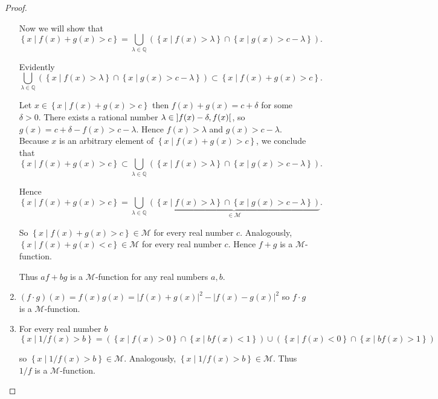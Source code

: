 \begin{proof}
\begin{enumerate}[label={(\arabic*)}]
		      Now we will show that
		      \[
			      \left\{ x \mid f(x) + g(x) > c \right\} = \bigcup_{\lambda \in \mathbb{Q}} \left( \left\{ x \mid f(x) > \lambda \right\} \cap \left\{ x \mid g(x) > c - \lambda \right\} \right).
		      \]

		      Evidently
		      \[
			      \bigcup_{\lambda \in \mathbb{Q}} \left( \left\{ x \mid f(x) > \lambda \right\} \cap \left\{ x \mid g(x) > c - \lambda \right\} \right) \subset \left\{ x \mid f(x) + g(x) > c \right\}.
		      \]

		      Let \( x \in \left\{ x \mid f(x) + g(x) > c \right\} \) then \( f(x) + g(x) = c + \delta \) for some \( \delta > 0 \). There exists a rational number \( \lambda \in \left\rbrack{f(x) - \delta, f(x)}\right\lbrack \), so \( g(x) = c + \delta - f(x) > c - \lambda \). Hence \( f(x) > \lambda \) and \( g(x) > c - \lambda \). Because \( x \) is an arbitrary element of \(  \left\{ x \mid f(x) + g(x) > c \right\} \), we conclude that
		      \[
			      \left\{ x \mid f(x) + g(x) > c \right\} \subset \bigcup_{\lambda \in \mathbb{Q}} \left( \left\{ x \mid f(x) > \lambda \right\} \cap \left\{ x \mid g(x) > c - \lambda \right\} \right).
		      \]

		      Hence
		      \[
			      \left\{ x \mid f(x) + g(x) > c \right\} = \bigcup_{\lambda \in \mathbb{Q}} \underbrace{\left( \left\{ x \mid f(x) > \lambda \right\} \cap \left\{ x \mid g(x) > c - \lambda \right\} \right)}_{\in \mathscr{M}}.
		      \]

		      So \( \left\{ x \mid f(x) + g(x) > c \right\} \in \mathscr{M} \) for every real number \( c \). Analogously, \( \left\{ x \mid f(x) + g(x) < c \right\} \in \mathscr{M} \) for every real number \( c \). Hence \( f + g \) is a \( \mathscr{M} \)-function.

		      Thus \( af + bg \) is a \( \mathscr{M} \)-function for any real numbers \( a, b \).
		\item \( (f\cdot g)(x) = f(x)g(x) = {\left\vert f(x) + g(x) \right\vert}^{2} - {\left\vert f(x) - g(x) \right\vert}^{2} \) so \( f\cdot g \) is a \( \mathscr{M} \)-function.
		\item For every real number \( b \)
		      \[
			      \left\{ x \mid 1/f(x) > b \right\} = (\left\{ x \mid f(x) > 0 \right\} \cap \left\{ x \mid bf(x) < 1 \right\}) \cup (\left\{ x \mid f(x) < 0 \right\} \cap \left\{ x \mid bf(x) > 1 \right\})
		      \]

		      so \( \left\{ x \mid 1/f(x) > b \right\} \in \mathscr{M} \). Analogously, \( \left\{ x \mid 1/f(x) > b \right\} \in \mathscr{M} \). Thus \( 1/f \) is a \( \mathscr{M} \)-function.
	\end{enumerate}
\end{proof}

